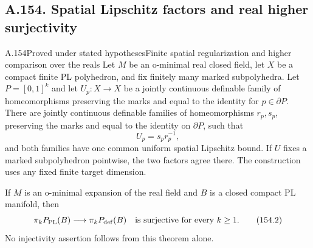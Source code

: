 \subsection{A.154. Spatial Lipschitz factors and real higher surjectivity}

\begin{saresult}{A.154}{Proved under stated hypotheses}{Finite spatial regularization and higher comparison over the reals}
Let $M$ be an o-minimal real closed field, let $X$ be a compact
finite PL polyhedron, and fix finitely many marked subpolyhedra.
Let $P=[0,1]^k$ and let $U_p:X\to X$ be a jointly continuous
definable family of homeomorphisms preserving the marks and
equal to the identity for $p\in\partial P$. There are jointly
continuous definable families of homeomorphisms $r_p,s_p$,
preserving the marks and equal to the identity on $\partial P$,
such that
\[
 U_p=s_pr_p^{-1},
 \tag{154.1}
\]
and both families have one common uniform spatial Lipschitz
bound. If $U$ fixes a marked subpolyhedron pointwise, the two
factors agree there. The construction uses any fixed finite
target dimension.

If $M$ is an o-minimal expansion of the real field and $B$ is
a closed compact PL manifold, then
\[
 \pi_kP_{\rm PL}(B)\longrightarrow\pi_kP_{\rm def}(B)
 \quad\hbox{is surjective for every }k\ge1.
 \tag{154.2}
\]
No injectivity assertion follows from this theorem alone.
\end{saresult}

